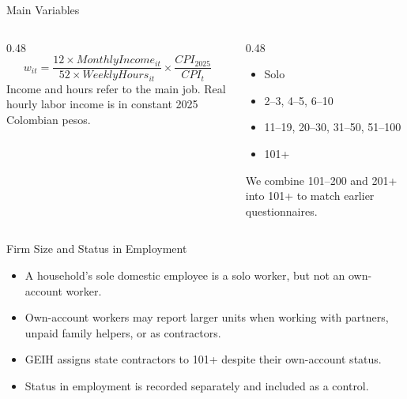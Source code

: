 \begin{frame}{Main Variables}
  \begin{columns}[T,totalwidth=\textwidth]
    \begin{column}{0.48\textwidth}
      \vspace{0.25cm}
      \[
        w_{it} =
        \frac{12 \times MonthlyIncome_{it}}
        {52 \times WeeklyHours_{it}}
        \times
        \frac{CPI_{2025}}{CPI_t}
      \]
      \vspace{0.1cm}
      {\small Income and hours refer to the main job. Real hourly labor income is in constant 2025 Colombian pesos.}
    \end{column}
    \begin{column}{0.48\textwidth}
      \vspace{0.25cm}
      \begin{itemize}
        \item Solo
        \item 2--3, 4--5, 6--10
        \item 11--19, 20--30, 31--50, 51--100
        \item 101+
      \end{itemize}
      {\small We combine 101--200 and 201+ into 101+ to match earlier questionnaires.}
    \end{column}
  \end{columns}
\end{frame}

\begin{frame}{Firm Size and Status in Employment}
  \vspace{0.3cm}
  \begin{itemize}
    \item A household's sole domestic employee is a solo worker, but not an own-account worker.
    \item Own-account workers may report larger units when working with partners, unpaid family helpers, or as contractors.
    \item GEIH assigns state contractors to 101+ despite their own-account status.
    \item Status in employment is recorded separately and included as a control.
  \end{itemize}
\end{frame}


